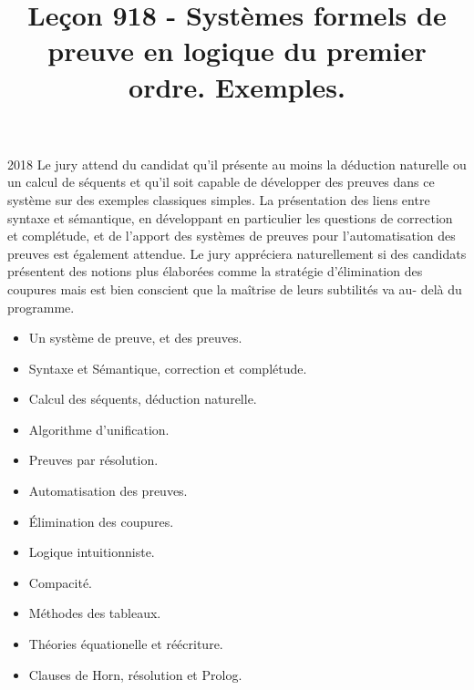 \documentclass{agregfiche}
\title{Leçon 918 - Systèmes formels de preuve en logique du premier ordre. Exemples.}
\begin{document}
\maketitle

\secrapports
\begin{rapport}{2018}
	Le jury attend du candidat qu’il présente au moins la déduction naturelle ou un calcul de séquents
	et qu’il soit capable de développer des preuves dans ce système sur des exemples classiques simples.
	La présentation des liens entre syntaxe et sémantique, en développant en particulier les questions de
	correction et complétude, et de l’apport des systèmes de preuves pour l’automatisation des preuves est
	également attendue.
	Le jury appréciera naturellement si des candidats présentent des notions plus élaborées comme la
	stratégie d’élimination des coupures mais est bien conscient que la maîtrise de leurs subtilités va au-
	delà du programme.
\end{rapport}

\secindispensables

\begin{itemize}
	\item Un système de preuve, et des preuves.
	\item Syntaxe et Sémantique, correction et complétude.
\end{itemize}

\secasavoir

\begin{itemize}
	\item Calcul des séquents, déduction naturelle.
	\item Algorithme d'unification.
	\item Preuves par résolution.
	\item Automatisation des preuves.
\end{itemize}

\secidees

\begin{itemize}
	\item Élimination des coupures.
	\item Logique intuitionniste.
	\item Compacité.
	\item Méthodes des tableaux.
	\item Théories équationelle et réécriture.
	\item Clauses de Horn, résolution et Prolog.
\end{itemize}

\secpieges
\end{document}
